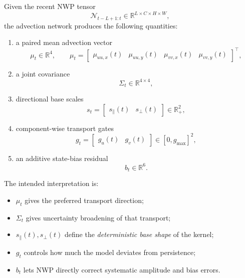 \documentclass[11pt,a4paper]{article}
\newcommand{\R}{\mathbb{R}}
\begin{document}
Given the recent NWP tensor
\begin{equation}
\mathcal{N}_{t-L+1:t} \in \R^{L \times C \times H \times W},
\end{equation}
the advection network produces the following quantities:
\begin{enumerate}[label=\arabic*.]
  \item a paired mean advection vector
  \begin{equation}
  \mu_t \in \R^4,
  \qquad
  \mu_t =
  \begin{bmatrix}
  \mu_{uu,x}(t) & \mu_{uu,y}(t) & \mu_{vv,x}(t) & \mu_{vv,y}(t)
  \end{bmatrix}^{\!\top},
  \end{equation}
  \item a joint covariance
  \begin{equation}
  \Sigma_t \in \R^{4 \times 4},
  \end{equation}
  \item directional base scales
  \begin{equation}
  s_t =
  \begin{bmatrix}
  s_{\parallel}(t) & s_{\perp}(t)
  \end{bmatrix}
  \in \R_{+}^2,
  \end{equation}
  \item component-wise transport gates
  \begin{equation}
  g_t =
  \begin{bmatrix}
  g_u(t) & g_v(t)
  \end{bmatrix}
  \in [0,g_{\max}]^2,
  \end{equation}
  \item an additive state-bias residual
  \begin{equation}
  b_t \in \R^6.
  \end{equation}
\end{enumerate}

The intended interpretation is:
\begin{itemize}
  \item $\mu_t$ gives the preferred transport direction;
  \item $\Sigma_t$ gives uncertainty broadening of that transport;
  \item $s_{\parallel}(t), s_{\perp}(t)$ define the \emph{deterministic base shape} of the kernel;
  \item $g_t$ controls how much the model deviates from persistence;
  \item $b_t$ lets NWP directly correct systematic amplitude and bias errors.
\end{itemize}
\end{document}
